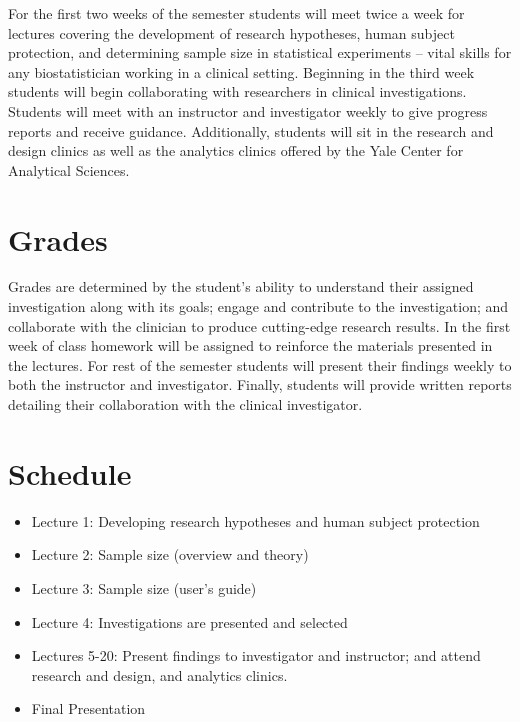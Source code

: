 \documentclass[12pt]{article}
\begin{document}
\begin{raggedright}
For the first two weeks of the semester students will meet twice a week for
lectures covering the development of research hypotheses, human subject 
protection, and determining sample size in statistical experiments -- vital
skills for any biostatistician working in a clinical setting.  Beginning 
in the third week students will begin collaborating with researchers in 
clinical investigations.  Students will meet with an instructor and
investigator weekly to give progress reports and receive guidance.
Additionally, students will sit in the research and design clinics
as well as the analytics clinics offered by the Yale Center for Analytical
Sciences.

\section{Grades}

Grades are determined by the student's ability to understand their assigned
investigation along with its goals; engage and contribute to the investigation;
and collaborate with the clinician to produce cutting-edge research results.
In the first week of class homework will be assigned to reinforce the 
materials presented in the lectures.  For rest of the semester students
will present their findings weekly to both the instructor and investigator.
Finally, students will provide written reports detailing their collaboration
with the clinical investigator.

\section{Schedule}

\begin{itemize}
\item Lecture 1: Developing research hypotheses and human subject protection
\item Lecture 2: Sample size (overview and theory)
\item Lecture 3: Sample size (user's guide)
\item Lecture 4: Investigations are presented and selected
\item Lectures 5-20: Present findings to investigator and instructor; and 
  attend research and design, and analytics clinics.
\item Final Presentation
\end{itemize}

\end{raggedright}
\end{document}
